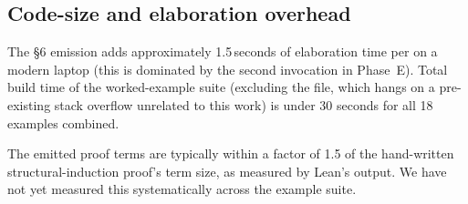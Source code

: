 \subsection{Code-size and elaboration overhead}

The §6 emission adds approximately 1.5\,seconds of elaboration time per
 on a modern laptop (this is dominated by the second
 invocation in Phase~E). Total build
time of the worked-example suite (excluding the
 file, which hangs on a pre-existing
 stack overflow unrelated to this work) is under
30 seconds for all 18 examples combined.

The emitted proof terms are typically within a factor of 1.5 of the
hand-written structural-induction proof's term size, as measured by Lean's
 output. We have not yet measured this systematically across
the example suite.
